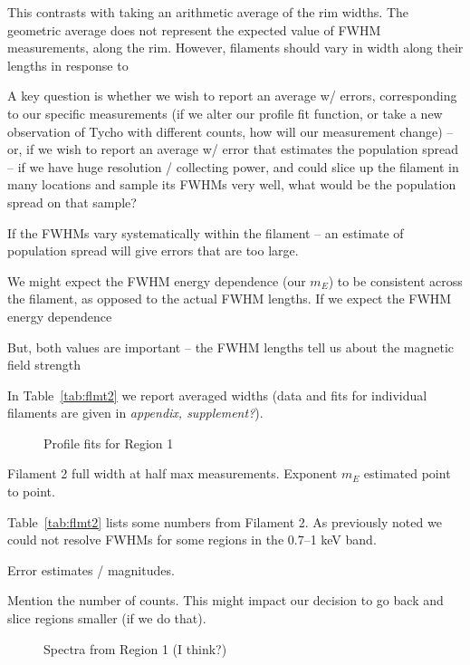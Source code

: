 \documentclass[12pt,preprint]{aastex}  %
\begin{document}
This contrasts with taking an arithmetic average of the rim widths.  The
geometric average does not represent the expected value of FWHM measurements,
along the rim.  However, filaments should vary in width along their lengths in
response to 


A key question is whether we wish to report an average w/ errors, corresponding
to our specific measurements (if we alter our profile fit function, or take a
new observation of Tycho with different counts, how will our measurement
change) -- or, if we wish to report an average w/ error that estimates the
population spread -- if we have huge resolution / collecting power, and could
slice up the filament in many locations and sample its FWHMs very well, what
would be the population spread on that sample?


If the FWHMs vary systematically within the filament -- an estimate of
population spread will give errors that are too large.

We might expect the FWHM energy dependence (our $m_E$) to be consistent across
the filament, as opposed to the actual FWHM lengths.
If we expect the FWHM energy dependence


But, both values are important -- the FWHM lengths tell us about the magnetic
field strength


In Table~\ref{tab:flmt2} we report averaged widths (data and fits for
individual filaments are given in \emph{appendix, supplement?}).


\begin{figure}
    \caption{Profile fits for Region 1}
    \label{fig:profiles}
\end{figure}


\begin{table*}
\scriptsize
\centering
\caption{Filament 2 full width at half max measurements.
Exponent $m_E$ estimated point to point.\label{tab:flmt2}}

\end{table*}

Table~\ref{tab:flmt2} lists some numbers from Filament 2.  As previously noted
we could not resolve FWHMs for some regions in the 0.7--1 keV band.

Error estimates / magnitudes.

Mention the number of counts.  This might impact our decision to go back and
slice regions smaller (if we do that).

\begin{figure}
    \caption{Spectra from Region 1 (I think?)}
    \label{fig:spec}
\end{figure}
\end{document}
